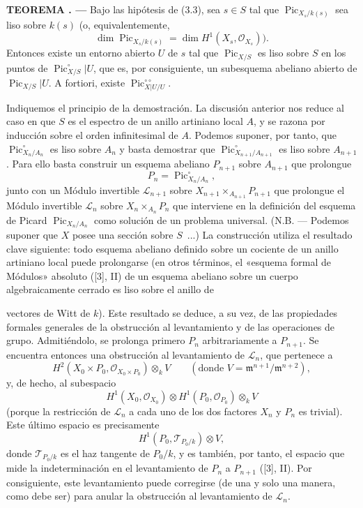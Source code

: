 \documentclass[11pt,twoside,openany]{book}
\numberwithin{equation}{section}
\newcommand{\src}[1]{%
  \phantomsection\hypertarget{src:#1}{}%
  \marginpar{\raggedleft\footnotesize\sffamily #1}%
}
\theoremstyle{plain}
\theoremstyle{definition}
\theoremstyle{remark}
\newcommand{\result}[2]{%
  \par\medskip\noindent\textbf{#1%
  \if\relax\detokenize{#2}\relax\else\space#2\fi. ---}\enspace
}
\newcommand{\FgaUnitKey}{frontmatter}
\renewcommand{\src}[1]{%
  \phantomsection\hypertarget{src:\FgaUnitKey:#1}{}%
  \marginpar{\raggedleft\footnotesize\sffamily #1}%
}
\theoremstyle{plain}
\theoremstyle{definition}
\theoremstyle{remark}
\begin{document}
\result{TEOREMA}{3.5} Bajo las hipótesis de (3.3), sea $s\in S$ tal que
$\operatorname{Pic}_{X_s/k(s)}$ sea liso sobre $k(s)$ (o, equivalentemente,
\[
\dim\operatorname{Pic}_{X_s/k(s)}=\dim H^1(X_s,\mathcal O_{X_s})).
\]
Entonces existe un entorno abierto $U$ de $s$ tal que
$\operatorname{Pic}_{X/S}$ es liso sobre $S$ en los puntos de
$\operatorname{Pic}_{X/S}^\circ|U$, que es, por consiguiente, un subesquema
abeliano abierto de $\operatorname{Pic}_{X/S}|U$. A fortiori, existe
$\operatorname{Pic}_{X|U/U}^{\circ\circ}$.

Indiquemos el principio de la demostración. La discusión anterior nos reduce
al caso en que $S$ es el espectro de un anillo artiniano local $A$, y se razona
por inducción sobre el orden infinitesimal de $A$. Podemos suponer, por tanto,
que $\operatorname{Pic}_{X_n/A_n}^\circ$ es liso sobre $A_n$ y basta demostrar
que $\operatorname{Pic}_{X_{n+1}/A_{n+1}}^\circ$ es liso sobre $A_{n+1}$. Para
ello basta construir un esquema abeliano $P_{n+1}$ sobre $A_{n+1}$ que prolongue
\[
P_n=\operatorname{Pic}_{X_n/A_n}^\circ,
\]
junto con un Módulo invertible $\mathcal L_{n+1}$ sobre
$X_{n+1}\times_{A_{n+1}}P_{n+1}$ que prolongue el Módulo invertible
$\mathcal L_n$ sobre $X_n\times_{A_n}P_n$ que interviene en la definición del
esquema de Picard $\operatorname{Pic}_{X_n/A_n}$ como solución de un problema
universal. (N.B. --- Podemos suponer que $X$ posee una sección sobre $S$~...)
La construcción utiliza el resultado clave siguiente: todo esquema abeliano
definido sobre un cociente de un anillo artiniano local puede prolongarse (en
otros términos, el «esquema formal de Módulos» absoluto ([3], II) de un esquema
abeliano sobre un cuerpo algebraicamente cerrado es liso sobre el anillo de

\src{240}
vectores de Witt de $k$). Este resultado se deduce, a su vez, de las propiedades
formales generales de la obstrucción al levantamiento y de las operaciones de
grupo. Admitiéndolo, se prolonga primero $P_n$ arbitrariamente a $P_{n+1}$. Se
encuentra entonces una obstrucción al levantamiento de $\mathcal L_n$, que
pertenece a
\[
H^2(X_0\times P_0,\mathcal O_{X_0\times P_0})\otimes_k V
\qquad(\text{donde }V=\mathfrak m^{n+1}/\mathfrak m^{n+2}),
\]
y, de hecho, al subespacio
\[
H^1(X_0,\mathcal O_{X_0})\otimes
H^1(P_0,\mathcal O_{P_0})\otimes_k V
\]
(porque la restricción de $\mathcal L_n$ a cada uno de los dos factores $X_n$
y $P_n$ es trivial). Este último espacio es precisamente
\[
H^1(P_0,\mathcal T_{P_0/k})\otimes V,
\]
donde $\mathcal T_{P_0/k}$ es el haz tangente de $P_0/k$, y es también, por
tanto, el espacio que mide la indeterminación en el levantamiento de $P_n$ a
$P_{n+1}$ ([3], II). Por consiguiente, este levantamiento puede corregirse (de
una y solo una manera, como debe ser) para anular la obstrucción al
levantamiento de $\mathcal L_n$.
\end{document}

